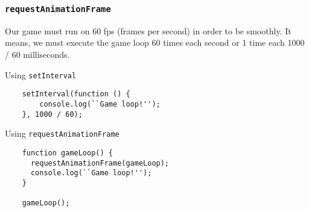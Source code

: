 \begin{frame}[fragile]
  \frametitle{\texttt{requestAnimationFrame}}

  Our game must run on 60 fps (frames per second) in order to be smoothly. It means, we must execute the game loop 60 times each second or 1 time each 1000 / 60 milliseconds.

  \pause

  \begin{block}{Using \texttt{setInterval}}
  {\scriptsize
  \begin{verbatim}
    setInterval(function () {
        console.log(``Game loop!'');
    }, 1000 / 60);
  \end{verbatim}
  }
  \end{block}

  \pause

  \begin{block}{Using \texttt{requestAnimationFrame}}
  {\scriptsize
  \begin{verbatim}
    function gameLoop() {
      requestAnimationFrame(gameLoop);
      console.log(``Game loop!'');
    }

    gameLoop();
  \end{verbatim}
  }
  \end{block}
\end{frame}
